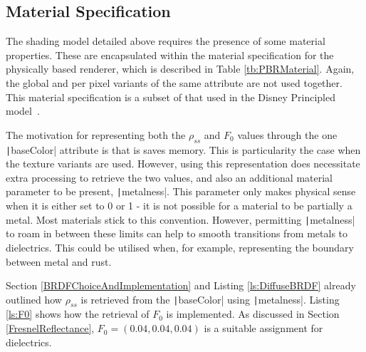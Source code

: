 

\subsection{Material Specification} \label{PBRMaterialSpecification}

The shading model detailed above requires the presence of some material properties. These are encapsulated within the material specification for the physically based renderer, which is described in Table \ref{tb:PBRMaterial}. Again, the global and per pixel variants of the same attribute are not used together. This material specification is a subset of that used in the Disney Principled model~\cite{Burley2012Physically}.

The motivation for representing both the \begin{math}\rho_{ss}\end{math} and \begin{math}F_0\end{math} values through the one \texttt|baseColor| attribute is that is saves memory. This is particularity the case when the texture variants are used.  However, using this representation does necessitate extra processing to retrieve the two values, and also an additional material parameter to be present, \texttt|metalness|. This parameter only makes physical sense when it is either set to 0 or 1 - it is not possible for a material to be partially a metal. Most materials stick to this convention. However, permitting \texttt|metalness| to roam in between these limits can help to smooth transitions from metals to dielectrics. This could be utilised when, for example, representing the boundary between metal and rust.

Section \ref{BRDFChoiceAndImplementation} and Listing \ref{ls:DiffuseBRDF} already outlined how \begin{math}\rho_{ss}\end{math} is retrieved from the \texttt|baseColor| using \texttt|metalness|. Listing \ref{ls:F0} shows how the retrieval of \begin{math}F_0\end{math} is implemented. As discussed in Section \ref{FresnelReflectance}, \begin{math}F_0 = (0.04, 0.04, 0.04)\end{math} is a suitable assignment for dielectrics.

